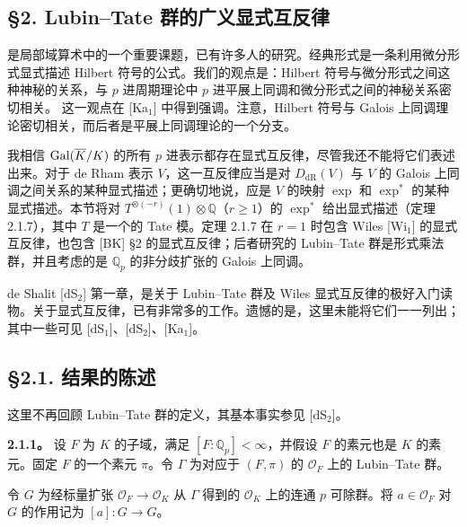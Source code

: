 \subsection*{§2. Lubin--Tate 群的广义显式互反律}
是局部域算术中的一个重要课题，已有许多人的研究。经典形式是一条利用微分形式显式描述 Hilbert 符号的公式。我们的观点是：Hilbert 符号与微分形式之间这种神秘的关系，与 $p$ 进周期理论中 $p$ 进平展上同调和微分形式之间的神秘关系密切相关。
这一观点在 [Ka$_1$] 中得到强调。注意，Hilbert 符号与 Galois 上同调理论密切相关，而后者是平展上同调理论的一个分支。

我相信 $\operatorname{Gal}(\overline K/K)$ 的所有 $p$ 进表示都存在显式互反律，尽管我还不能将它们表述出来。对于 de Rham 表示 $V$，这一互反律应当是对 $D_{\mathrm{dR}}(V)$ 与 $V$ 的 Galois 上同调之间关系的某种显式描述；更确切地说，应是 $V$ 的映射 $\exp$ 和 $\exp^*$ 的某种显式描述。本节将对
$T^{\otimes(-r)}(1)\otimes\mathbb Q$（$r\ge1$）的 $\exp^*$ 给出显式描述（定理 2.1.7），其中 $T$ 是一个的 Tate 模。定理 2.1.7 在 $r=1$ 时包含 Wiles [Wi$_1$] 的显式互反律，也包含 [BK] §2 的显式互反律；后者研究的 Lubin--Tate 群是形式乘法群，并且考虑的是 $\mathbb Q_p$ 的非分歧扩张的 Galois 上同调。

de Shalit [dS$_2$] 第一章，是关于 Lubin--Tate 群及 Wiles 显式互反律的极好入门读物。关于显式互反律，已有非常多的工作。遗憾的是，这里未能将它们一一列出；其中一些可见 [dS$_1$]、[dS$_2$]、[Ka$_1$]。

\subsection*{§2.1. 结果的陈述}
这里不再回顾 Lubin--Tate 群的定义，其基本事实参见 [dS$_2$]。

\textbf{2.1.1。} 设 $F$ 为 $K$ 的子域，满足 $[F:\mathbb Q_p]<\infty$，并假设 $F$ 的素元也是 $K$ 的素元。固定 $F$ 的一个素元 $\pi$。令 $\Gamma$ 为对应于 $(F,\pi)$ 的 $\mathcal O_F$ 上的 Lubin--Tate 群。

令 $G$ 为经标量扩张 $\mathcal O_F\longrightarrow\mathcal O_K$ 从 $\Gamma$ 得到的 $\mathcal O_K$ 上的连通 $p$ 可除群。将 $a\in\mathcal O_F$ 对 $G$ 的作用记为 $[a]:G\longrightarrow G$。

